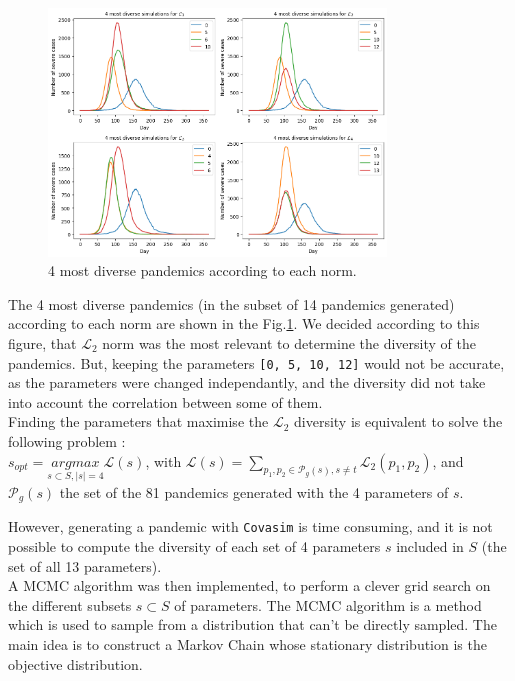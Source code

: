 \begin{figure}
    \centering
    \includegraphics[width=0.8\textwidth]{figures/most_different_pandemics.png}
    \caption{4 most diverse pandemics according to each norm.}
    \label{fig:diversity_pandemics}
\end{figure}


The 4 most diverse pandemics (in the subset of 14 pandemics generated) according to each norm are shown in the Fig.\ref{fig:diversity_pandemics}.
We decided according to this figure, that $\mathcal{L}_2$ norm was the most relevant to determine the diversity of the pandemics.
But, keeping the parameters \texttt{[0, 5, 10, 12]} would not be accurate, as the parameters were changed independantly, and the diversity did not take into account the correlation between some of them. \\

Finding the parameters that maximise the $\mathcal{L}_2$ diversity is equivalent to solve the following problem : \\

$ s_{opt} = \underset{s \subset S , \vert s \vert =4 }{argmax} \mathcal{L}(s)$, with $ \mathcal{L}(s)= \sum_{p_1, p_2 \in \mathcal{P}_g(s) , s \neq t }{\mathcal{L}_2(p_1,p_2)}$, and  $\mathcal{P}_{g}(s)$ the set of the 81 pandemics generated with the 4 parameters of $s$.

However, generating a pandemic with \texttt{Covasim} is time consuming, and it is not possible to compute the diversity of each set of 4 parameters $s$ included in $S$ (the set of all 13 parameters).\\[1cm]


A MCMC algorithm \cite*{diaconis2009markov} was then implemented, to perform a clever grid search on the different subsets $s \subset S $ of parameters.
The MCMC algorithm is a method which is used to sample from a distribution that can't be directly sampled. 
The main idea is to construct a Markov Chain whose stationary distribution is the objective distribution.

